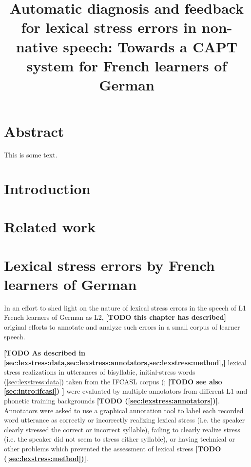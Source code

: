 \documentclass[11pt,a4paper,onecolumn]{article}
\title{Automatic diagnosis and feedback for lexical stress errors in non-native speech: Towards a CAPT system for French learners of German}
\newcommand{\TODO}[1]{{\color{red}\textbf{[TODO #1]}}}
\begin{document}
\maketitle

\section*{Abstract}

This is some text. 
\section{Introduction}

\section{Related work}

\section{Lexical stress errors by French learners of German}

In an effort to shed light on the nature of lexical stress errors in the speech of L1 French learners of German as L2, \TODO{this chapter has described} original efforts to 
	annotate and analyze such errors in a small corpus of learner speech.
	
	\TODO{As described in \cref{sec:lexstress:data,sec:lexstress:annotators,sec:lexstress:method},}
	lexical stress realizations in utterances of bisyllabic, initial-stress words (\cref{sec:lexstress:data})
	taken from the IFCASL corpus (\cite{Trouvain2013,Fauth2014}; \TODO{see also \cref{sec:intro:ifcasl}) }
	were evaluated by multiple annotators from different L1 and phonetic training backgrounds \TODO{(\cref{sec:lexstress:annotators})}.
	Annotators were asked to use a graphical annotation tool to label each recorded word utterance
	as correctly or incorrectly realizing lexical stress (i.e. the speaker clearly stressed the correct or incorrect syllable), failing to clearly realize stress (i.e. the speaker did not seem to stress either syllable), or having technical or other problems which prevented the assessment of lexical stress \TODO{(\cref{sec:lexstress:method})}.
	
\end{document}
